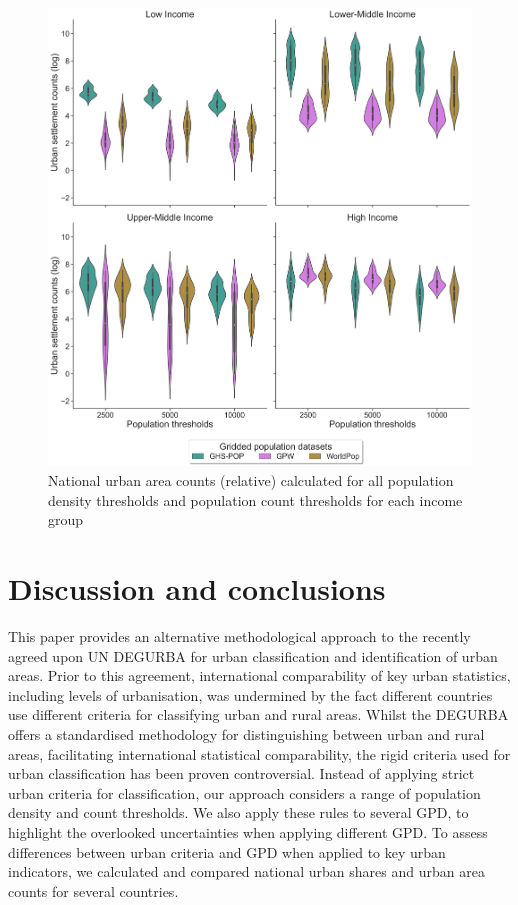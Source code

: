 \documentclass[review]{elsarticle}
\begin{document}
	
	\begin{figure}[H]
		\includegraphics[width=\textwidth]{national_urban_area_counts_income}
		\caption{National urban area counts (relative) calculated for all population density thresholds and population count thresholds for each income group}
		\label{fig:settlement_income_violinplot}
	\end{figure}
	
	
	\section{Discussion and conclusions}
	This paper provides an alternative methodological approach to the recently agreed upon UN DEGURBA for urban classification and identification of urban areas.
	Prior to this agreement, international comparability of key urban statistics, including levels of urbanisation, was undermined by the fact different countries use different criteria for classifying urban and rural areas.
	Whilst the DEGURBA offers a standardised methodology for distinguishing between urban and rural areas, facilitating  international statistical comparability, the rigid criteria used for urban classification has been proven controversial.
	Instead of applying strict urban criteria for classification, our approach considers a range of population density and count thresholds.
	We also apply these rules to several GPD, to highlight the overlooked uncertainties when applying different GPD.
	To assess differences between urban criteria and GPD when applied to key urban indicators, we calculated and compared national urban shares and urban area counts for several countries.
	
\end{document}
